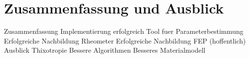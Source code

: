 \section{Zusammenfassung und Ausblick}
\begin{todocontent}
    \1 Zusammenfassung
        \2 Implementierung erfolgreich
        \2 Tool fuer Parameterbestimmung
        \2 Erfolgreiche Nachbildung Rheometer
        \2 Erfolgreiche Nachbildung FEP (hoffentlich)
    \1 Ausblick
        \2 Thixotropie
        \2 Bessere Algorithmen
        \2 Besseres Materialmodell
\end{todocontent}
